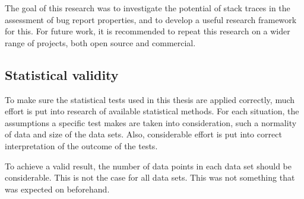 The goal of this research was to investigate the potential of stack traces in the assessment of bug report properties, and to develop a useful research framework for this. For future work, it is recommended to repeat this research on a wider range of projects, both open source and commercial.

\subsection{Statistical validity} %
\label{sub:statistical_validity}
To make sure the statistical tests used in this thesis are applied correctly, much effort is put into research of available statistical methods. For each situation, the assumptions a specific test makes are taken into consideration, such a normality of data and size of the data sets. Also, considerable effort is put into correct interpretation of the outcome of the tests.

To achieve a valid result, the number of data points in each data set should be considerable. This is not the case for all data sets. This was not something that was expected on beforehand.

